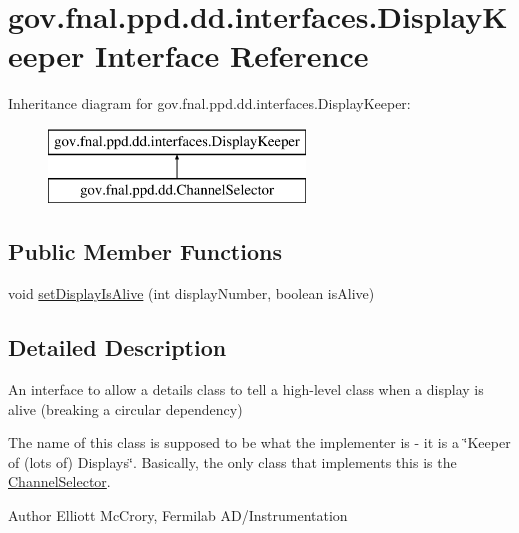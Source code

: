 \hypertarget{interfacegov_1_1fnal_1_1ppd_1_1dd_1_1interfaces_1_1DisplayKeeper}{\section{gov.\-fnal.\-ppd.\-dd.\-interfaces.\-Display\-Keeper Interface Reference}
\label{interfacegov_1_1fnal_1_1ppd_1_1dd_1_1interfaces_1_1DisplayKeeper}
}
Inheritance diagram for gov.\-fnal.\-ppd.\-dd.\-interfaces.\-Display\-Keeper\-:\begin{figure}[H]
\begin{center}
\leavevmode
\includegraphics[height=2.000000cm]{interfacegov_1_1fnal_1_1ppd_1_1dd_1_1interfaces_1_1DisplayKeeper}
\end{center}
\end{figure}
\subsection*{Public Member Functions}
\begin{DoxyCompactItemize}
\item 
void \hyperlink{interfacegov_1_1fnal_1_1ppd_1_1dd_1_1interfaces_1_1DisplayKeeper_ab647c0c13a64d5c5f258852f17407639}{set\-Display\-Is\-Alive} (int display\-Number, boolean is\-Alive)
\end{DoxyCompactItemize}


\subsection{Detailed Description}
An interface to allow a details class to tell a high-\/level class when a display is alive (breaking a circular dependency)

The name of this class is supposed to be what the implementer is -\/ it is a \char`\"{}\-Keeper of (lots of) Displays\char`\"{}. Basically, the only class that implements this is the \hyperlink{classgov_1_1fnal_1_1ppd_1_1dd_1_1ChannelSelector}{Channel\-Selector}.

\begin{DoxyAuthor}{Author}
Elliott Mc\-Crory, Fermilab A\-D/\-Instrumentation 
\end{DoxyAuthor}


